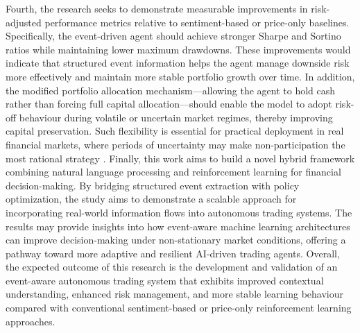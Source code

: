 \documentclass[a4paper,fleqn]{cas-sc}
\begin{document}
Fourth, the research seeks  to demonstrate measurable improvements in risk-adjusted performance metrics relative to sentiment-based or price-only baselines. Specifically, the event-driven agent should achieve stronger Sharpe and Sortino ratios while maintaining lower maximum drawdowns. These improvements would indicate that structured event information helps the agent manage downside risk more effectively and maintain more stable portfolio growth over time. In addition, the modified portfolio allocation mechanism—allowing the agent to hold cash rather than forcing full capital allocation—should enable the model to adopt risk-off behaviour during volatile or uncertain market regimes, thereby improving capital preservation. Such flexibility is essential for practical deployment in real financial markets, where periods of uncertainty may make non-participation the most rational strategy \cite{nine}. 
Finally, this work aims to build a novel hybrid framework combining natural language processing and reinforcement learning for financial decision-making. By bridging structured event extraction with policy optimization, the study aims to demonstrate a scalable approach for incorporating real-world information flows into autonomous trading systems. The results may provide insights into how event-aware machine learning architectures can improve decision-making under non-stationary market conditions, offering a pathway toward more adaptive and resilient AI-driven trading agents. 
Overall, the expected outcome of this research is the development and validation of an event-aware autonomous trading system that exhibits improved contextual understanding, enhanced risk management, and more stable learning behaviour compared with conventional sentiment-based or price-only reinforcement learning approaches. 

\makeatletter
\def\ssectionfont{\rmfamily\fontsize{12pt}{14pt}\selectfont}
\makeatother
\end{document}
